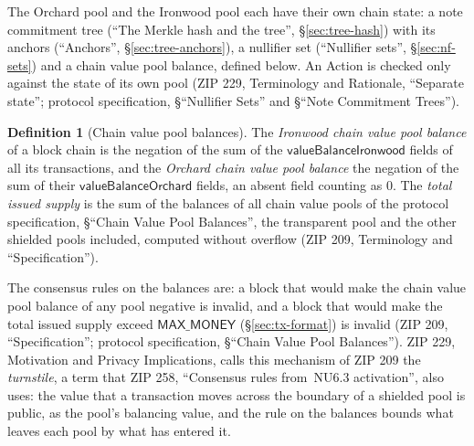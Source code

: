 \documentclass[11pt,a4paper]{article}
\theoremstyle{definition}
\newtheorem{definition}[theorem]{Definition}
\begin{document}
The Orchard pool and the Ironwood pool each have their own chain state: a
note commitment tree (``The Merkle hash and the tree'',
\S\ref{sec:tree-hash}) with its anchors (``Anchors'',
\S\ref{sec:tree-anchors}), a nullifier set (``Nullifier sets'',
\S\ref{sec:nf-sets}) and a chain value pool balance, defined below. An
Action is checked only against the state of its own pool (ZIP 229,
Terminology and Rationale, ``Separate state''; protocol specification,
\S``Nullifier Sets'' and \S``Note Commitment Trees'').

\begin{definition}[Chain value pool balances]
The \emph{Ironwood chain value pool balance} of a block chain is the
negation of the sum of the $\mathsf{valueBalanceIronwood}$ fields of all its
transactions, and the \emph{Orchard chain value pool balance} the negation
of the sum of their $\mathsf{valueBalanceOrchard}$ fields, an absent field
counting as $0$. The \emph{total issued supply} is the sum of the balances
of all chain value pools of the protocol specification, \S``Chain Value Pool
Balances'', the transparent pool and the other shielded pools included,
computed without overflow (ZIP 209, Terminology and ``Specification'').
\end{definition}

The consensus rules on the balances are: a block that would make the chain
value pool balance of any pool negative is invalid, and a block that would
make the total issued supply exceed $\mathsf{MAX\_MONEY}$
(\S\ref{sec:tx-format}) is invalid (ZIP 209, ``Specification''; protocol
specification, \S``Chain Value Pool Balances''). ZIP 229, Motivation and
Privacy Implications, calls this mechanism of ZIP 209 the
\emph{turnstile}, a term that ZIP 258, ``Consensus rules from~NU6.3
activation'', also uses: the value that a transaction moves across the
boundary of a shielded pool is public, as the pool's balancing value, and
the rule on the balances bounds what leaves each pool by what has entered
it.
\end{document}
